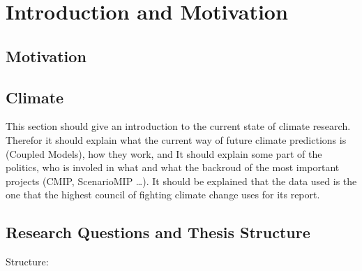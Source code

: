 \chapter{Introduction and Motivation}
\label{ch:intro}


\section{Motivation}
\label{sec:motivation}



\section{Climate}
\label{sec:climate}

This section should give an introduction to the current state of climate research. 
Therefor it should explain what the current way of future climate predictions is (Coupled Models), how they work, and 
It should explain some part of the politics, who is involed in what and what the backroud of the most important projects (CMIP, ScenarioMIP \dots). 
It should be explained that the data used is the one that the highest council of fighting climate change uses for its report. 



\section{Research Questions and Thesis Structure}
\label{sec:research_questions}


Structure:

